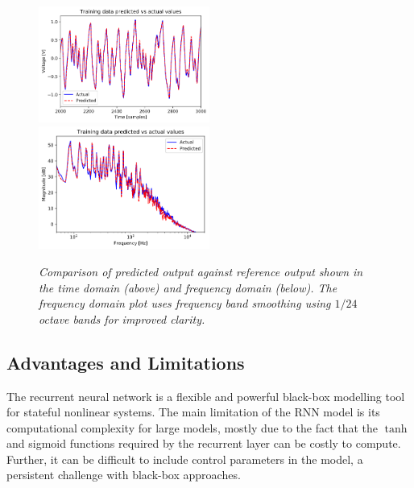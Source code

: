 \documentclass[twoside,a4paper]{article}
\begin{document}
\begin{figure}
    \centering
    \includegraphics[width=0.5\textwidth]{TimeDomain.png}
    \centering
    \includegraphics[width=0.5\textwidth]{FreqDomain.png}
    \caption{\label{fig:freqandtime} {\it Comparison of
        predicted output against reference output shown in
        the time domain (above) and frequency domain (below).
        The frequency domain plot uses frequency band smoothing
        using $1/24$ octave bands for improved clarity.}}
\end{figure}

\subsection{Advantages and Limitations}
The recurrent neural network is a flexible and powerful
black-box modelling tool for stateful nonlinear systems.
The main limitation of the RNN model is its computational
complexity for large models, mostly due to the fact that the
$\tanh$ and sigmoid functions required by the recurrent layer
can be costly to compute. Further, it can be difficult to include
control parameters in the model, a persistent challenge with
black-box approaches.
\end{document}
